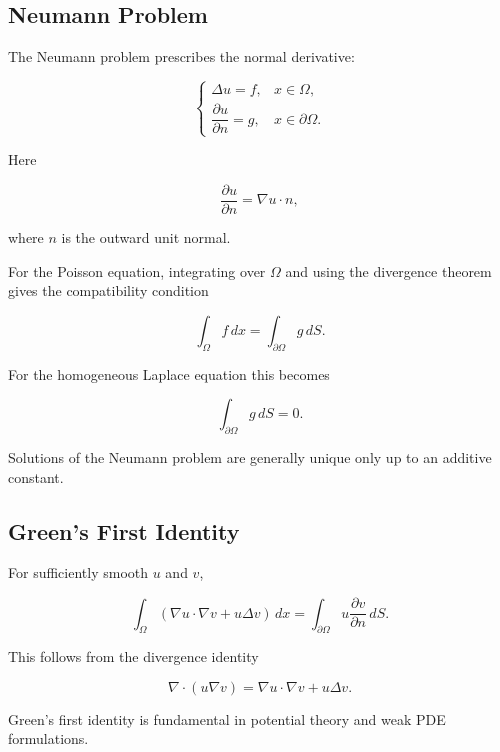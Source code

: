 \subsection{Neumann Problem}
\label{subsec:neumann-problem}

The Neumann problem prescribes the normal derivative:

\[
\boxed{
\begin{cases}
\Delta u=f,
& x\in\Omega,\\
\dfrac{\partial u}{\partial n}=g,
& x\in\partial\Omega.
\end{cases}
}
\]

Here

\[
\frac{\partial u}{\partial n}
=
\nabla u\cdot n,
\]

where \(n\) is the outward unit normal.

For the Poisson equation, integrating over \(\Omega\) and using the
divergence theorem gives the compatibility condition

\[
\boxed{
\int_\Omega f\,dx
=
\int_{\partial\Omega}g\,dS.
}
\]

For the homogeneous Laplace equation this becomes

\[
\boxed{
\int_{\partial\Omega}g\,dS=0.
}
\]

Solutions of the Neumann problem are generally unique only up to an
additive constant.

\subsection{Green's First Identity}
\label{subsec:greens-first-identity-potential}

For sufficiently smooth \(u\) and \(v\),

\[
\boxed{
\int_\Omega
\left(
\nabla u\cdot\nabla v
+
u\Delta v
\right)\,dx
=
\int_{\partial\Omega}
u\frac{\partial v}{\partial n}\,dS.
}
\]

This follows from the divergence identity

\[
\nabla\cdot(u\nabla v)
=
\nabla u\cdot\nabla v
+
u\Delta v.
\]

Green's first identity is fundamental in potential theory and weak PDE
formulations.

